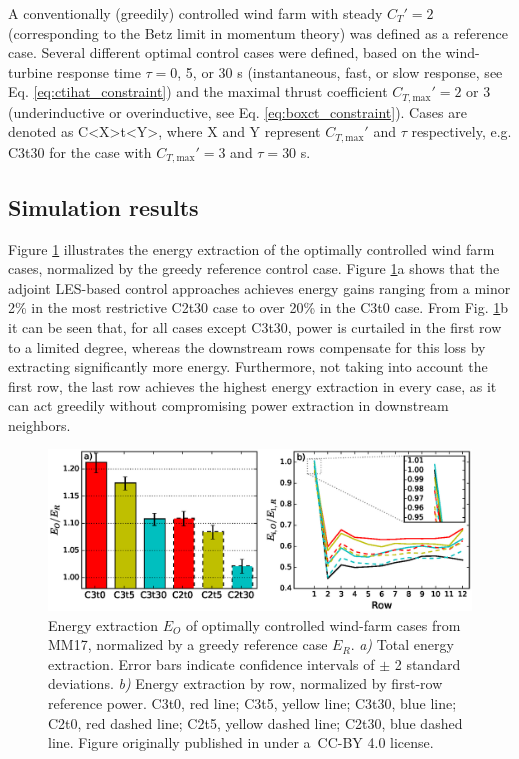 \documentclass[wes, manuscript]{copernicus}
\newcommand{\ctmax}{C_{T,\text{max}}'}
\begin{document}
A conventionally (greedily) controlled wind farm with steady $C_T' = 2$ (corresponding to the Betz limit in momentum theory) was defined as a reference case. Several different optimal control cases were defined, based on the wind-turbine response time $\tau = $0, 5, or 30 s (instantaneous, fast, or slow response, see Eq. \ref{eq:ctihat_constraint}) and the maximal thrust coefficient $\ctmax = 2$ or 3 (underinductive or overinductive, see Eq. \ref{eq:boxct_constraint}). Cases are denoted as C<X>t<Y>, where X and Y represent $\ctmax$ and $\tau$ respectively, e.g. C3t30  for the case with $\ctmax = 3$ and $\tau = 30$ s. 

\subsection{Simulation results}

Figure \ref{fig:power_MM17} illustrates the energy extraction of the optimally controlled wind farm cases, normalized by the greedy reference control case. Figure \ref{fig:power_MM17}a shows that the adjoint LES-based control approaches achieves energy gains ranging from a minor 2\% in the most restrictive C2t30 case to over 20\% in the C3t0 case. From Fig. \ref{fig:power_MM17}b it can be seen that, for all cases except C3t30, power is curtailed in the first row to a limited degree, whereas the downstream rows compensate for this loss by extracting significantly more energy. Furthermore, not taking into account the first row, the last row achieves the highest energy extraction in every case, as it can act greedily without compromising power extraction in downstream neighbors. 

\begin{figure}
	\includegraphics[width=\textwidth]{power_MM17}
	\caption{Energy extraction $E_O$ of optimally controlled wind-farm cases from MM17, normalized by a greedy reference case $E_R$. \emph{a)} Total energy extraction. Error bars indicate confidence intervals of $\pm$ 2 standard deviations. \emph{b)} Energy extraction by row, normalized by first-row reference power. C3t0, red line; C3t5, yellow line; C3t30, blue line; C2t0, red dashed line; C2t5, yellow dashed line; C2t30, blue dashed line. Figure originally published in \cite{munters2017optimal} under a~CC-BY 4.0 license.\label{fig:power_MM17}}
\end{figure}
\end{document}
